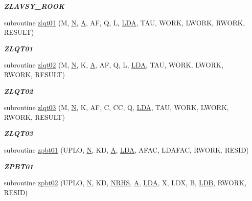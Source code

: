 \begin{DoxyCompactItemize}
\begin{DoxyCompactList}\small\item\em {\bfseries Z\+L\+A\+V\+S\+Y\+\_\+\+R\+O\+O\+K} \end{DoxyCompactList}\item 
subroutine \hyperlink{group__complex16__lin_ga2d81c34064e73a0a53cd66c99385d140}{zlqt01} (M, \hyperlink{polmisc_8c_a0240ac851181b84ac374872dc5434ee4}{N}, \hyperlink{classA}{A}, A\+F, Q, L, \hyperlink{example__user_8c_ae946da542ce0db94dced19b2ecefd1aa}{L\+D\+A}, T\+A\+U, W\+O\+R\+K, L\+W\+O\+R\+K, R\+W\+O\+R\+K, R\+E\+S\+U\+L\+T)
\begin{DoxyCompactList}\small\item\em {\bfseries Z\+L\+Q\+T01} \end{DoxyCompactList}\item 
subroutine \hyperlink{group__complex16__lin_ga5b8acc0848d06454b934a2b5b36cd001}{zlqt02} (M, \hyperlink{polmisc_8c_a0240ac851181b84ac374872dc5434ee4}{N}, K, \hyperlink{classA}{A}, A\+F, Q, L, \hyperlink{example__user_8c_ae946da542ce0db94dced19b2ecefd1aa}{L\+D\+A}, T\+A\+U, W\+O\+R\+K, L\+W\+O\+R\+K, R\+W\+O\+R\+K, R\+E\+S\+U\+L\+T)
\begin{DoxyCompactList}\small\item\em {\bfseries Z\+L\+Q\+T02} \end{DoxyCompactList}\item 
subroutine \hyperlink{group__complex16__lin_ga81396d8c7d1f677984d435b9f10aac01}{zlqt03} (M, \hyperlink{polmisc_8c_a0240ac851181b84ac374872dc5434ee4}{N}, K, A\+F, C, C\+C, Q, \hyperlink{example__user_8c_ae946da542ce0db94dced19b2ecefd1aa}{L\+D\+A}, T\+A\+U, W\+O\+R\+K, L\+W\+O\+R\+K, R\+W\+O\+R\+K, R\+E\+S\+U\+L\+T)
\begin{DoxyCompactList}\small\item\em {\bfseries Z\+L\+Q\+T03} \end{DoxyCompactList}\item 
subroutine \hyperlink{group__complex16__lin_gabb5ffd8545a87dd162fb11ac2f4e3135}{zpbt01} (U\+P\+L\+O, \hyperlink{polmisc_8c_a0240ac851181b84ac374872dc5434ee4}{N}, K\+D, \hyperlink{classA}{A}, \hyperlink{example__user_8c_ae946da542ce0db94dced19b2ecefd1aa}{L\+D\+A}, A\+F\+A\+C, L\+D\+A\+F\+A\+C, R\+W\+O\+R\+K, R\+E\+S\+I\+D)
\begin{DoxyCompactList}\small\item\em {\bfseries Z\+P\+B\+T01} \end{DoxyCompactList}\item 
subroutine \hyperlink{group__complex16__lin_ga60c4d834de3385cc11f567431bb3c6d5}{zpbt02} (U\+P\+L\+O, \hyperlink{polmisc_8c_a0240ac851181b84ac374872dc5434ee4}{N}, K\+D, \hyperlink{example__user_8c_aa0138da002ce2a90360df2f521eb3198}{N\+R\+H\+S}, \hyperlink{classA}{A}, \hyperlink{example__user_8c_ae946da542ce0db94dced19b2ecefd1aa}{L\+D\+A}, X, L\+D\+X, B, \hyperlink{example__user_8c_a50e90a7104df172b5a89a06c47fcca04}{L\+D\+B}, R\+W\+O\+R\+K, R\+E\+S\+I\+D)

\end{DoxyCompactItemize}
